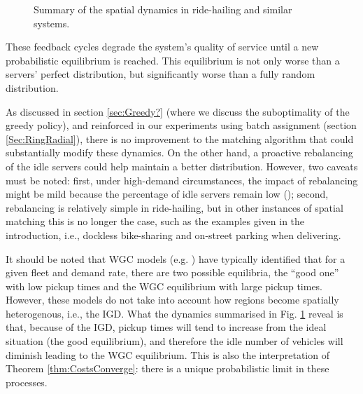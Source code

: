 \documentclass[12pt,english]{article}
\begin{document}
{\begin{figure}[ht]
{{\begin{tikzpicture}
\end{tikzpicture}


    }
  }
  \caption{Summary of the spatial dynamics in ride-hailing and similar systems.}
  \label{fig:SchemeIGD-WGC}
\end{figure}

These feedback cycles degrade the system's quality of service until a new probabilistic equilibrium is reached. This equilibrium is not only worse than a servers' perfect distribution, but significantly worse than a fully random distribution.

As discussed in section \ref{sec:Greedy?} (where we discuss the suboptimality of the greedy policy), and reinforced in our experiments using batch assignment (section \ref{Sec:RingRadial}), there is no improvement to the matching algorithm that could substantially modify these dynamics. On the other hand, a proactive rebalancing of the idle servers could help maintain a better distribution. However, two caveats must be noted: first, under high-demand circumstances, the impact of rebalancing might be mild  because the percentage of idle servers remain low (\citealt{fielbaum2022anticipatory}); second, rebalancing is relatively simple in ride-hailing, but in other instances of spatial matching this is no longer the case, such as the examples given in the introduction, i.e., dockless bike-sharing and on-street parking when delivering.

It should be noted that WGC models (e.g. \citealt{castillo2017surge,li2025wild}) have typically identified that for a given fleet and demand rate, there are two possible equilibria, the ``good one'' with low pickup times and the WGC equilibrium with large pickup times. However, these models do not take into account how regions become spatially heterogenous, i.e., the IGD. What the dynamics summarised in Fig. \ref{fig:SchemeIGD-WGC} reveal is that, because of the IGD, pickup times will tend to increase from the ideal situation (the good equilibrium), and therefore the idle number of vehicles will diminish leading to the WGC equilibrium. This is also the interpretation of Theorem \ref{thm:CostsConverge}: there is a unique probabilistic limit in these processes.

}
\end{document}
